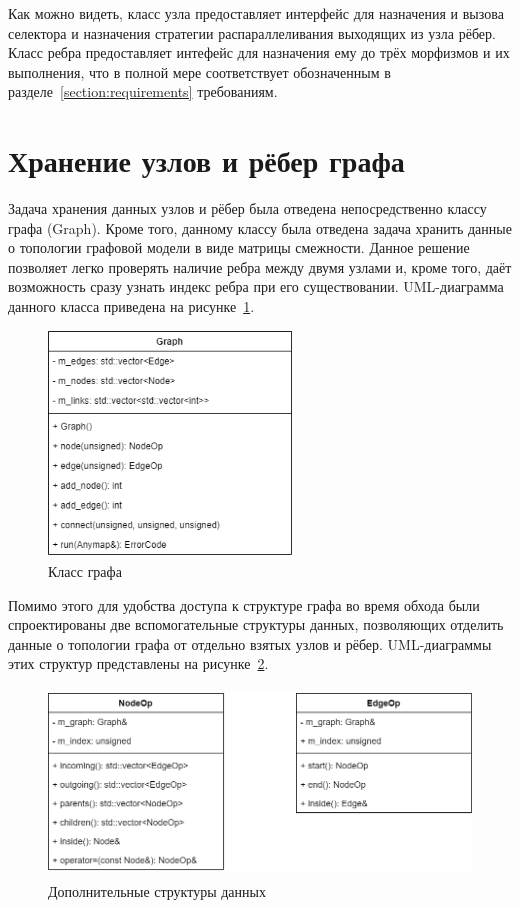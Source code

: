 Как можно видеть, класс узла предоставляет интерфейс для назначения и вызова селектора и назначения стратегии распараллеливания выходящих из узла рёбер. Класс ребра предоставляет интефейс для назначения ему до трёх морфизмов и их выполнения, что в полной мере соответствует обозначенным в разделе~\ref{section:requirements} требованиям.

\section{Хранение узлов и рёбер графа}
Задача хранения данных узлов и рёбер была отведена непосредственно классу графа (\textsf{Graph}). Кроме того, данному классу была отведена задача хранить данные о топологии графовой модели в виде матрицы смежности. Данное решение позволяет легко проверять наличие ребра между двумя узлами и, кроме того, даёт возможность сразу узнать индекс ребра при его существовании. UML-диаграмма данного класса приведена на рисунке~\ref{fig:classGraph}.
\begin{figure}[!ht]
    \centering
    \includegraphics[height=6cm]{figures/class.graph.png}
    \caption{Класс графа}
    \label{fig:classGraph}
\end{figure}

Помимо этого для удобства доступа к структуре графа во время обхода были спроектированы две вспомогательные структуры данных, позволяющих отделить данные о топологии графа от отдельно взятых узлов и рёбер. UML-диаграммы этих структур представлены на рисунке~\ref{fig:additionalGraphStructure}.
\begin{figure}[!ht]
    \centering
    \includegraphics[height=5cm]{figures/structure_additional.png}
    \caption{Дополнительные структуры данных}
    \label{fig:additionalGraphStructure}
\end{figure}

